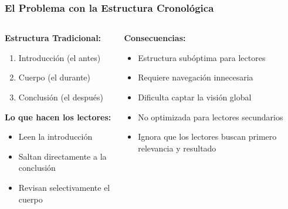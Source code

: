 \documentclass{beamer}
\begin{document}
\begin{frame}
\frametitle{El Problema con la Estructura Cronológica}

\begin{columns}[T]
\begin{column}{0.48\textwidth}
\textbf{Estructura Tradicional:}
\begin{enumerate}
    \item Introducción (el antes)
    \item Cuerpo (el durante)
    \item Conclusión (el después)
\end{enumerate}

\vspace{0.3cm}
\textbf{Lo que hacen los lectores:}
\begin{itemize}
    \item Leen la introducción
    \item Saltan directamente a la conclusión
    \item Revisan selectivamente el cuerpo
\end{itemize}
\end{column}

\begin{column}{0.48\textwidth}
\textbf{Consecuencias:}
\begin{itemize}
    \item Estructura subóptima para lectores
    \item Requiere navegación innecesaria
    \item Dificulta captar la visión global
    \item No optimizada para lectores secundarios
    \item Ignora que los lectores buscan primero relevancia y resultado
\end{itemize}
\end{column}
\end{columns}

\vspace{0.3cm}
\end{frame}
\end{document}
